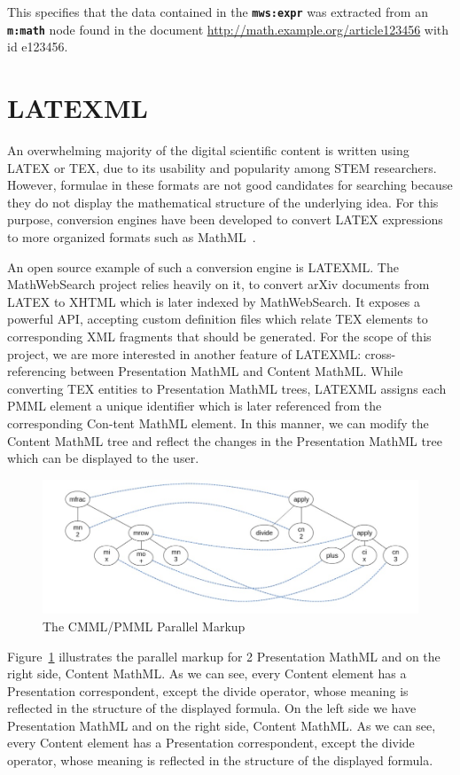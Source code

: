 \documentclass{deliverablereport}
\def\MWS{\textsf{MathWebSearch}\xspace}
\begin{document}
This specifies that the data contained in the \textbf{\texttt{mws:expr}} was extracted from an \textbf{\texttt{m:math}} node found in the document \url{http://math.example.org/article123456} with id e123456.

\section{LATEXML}\label{sec:ml}
An overwhelming majority of the digital scientific content is written using LATEX or TEX,
due to its usability and popularity among STEM researchers. However, formulae in these
formats are not good candidates for searching because they do not display the mathematical
structure of the underlying idea. For this purpose, conversion engines have been developed
to convert LATEX expressions to more organized formats such as MathML~\cite{Ham:bcs15}.

An open source example of such a conversion engine is LATEXML. The \MWS project
relies heavily on it, to convert arXiv documents from LATEX to XHTML which is later
indexed by \MWS. It exposes a powerful API, accepting custom definition files which relate
TEX elements to corresponding XML fragments that should be generated. For the scope of
this project, we are more interested in another feature of LATEXML: cross-referencing
between Presentation MathML and Content MathML. While converting TEX entities to
Presentation MathML trees, LATEXML assigns each PMML element a unique identifier which is
later referenced from the corresponding Con-tent MathML element. In this manner, we can
modify the Content MathML tree and reflect the changes in the Presentation MathML tree
which can be displayed to the user.
 

\begin{figure}[h]
\centering
 \includegraphics[scale=0.6]{figure2.jpg}
 \caption{The CMML/PMML Parallel Markup}
 \label{fig:markup}
\end{figure}

Figure~\ref{fig:markup} illustrates the parallel markup for 2 Presentation MathML and on the right side,
Content MathML. As we can see, every Content element has a Presentation correspondent,
except the divide operator, whose meaning is reflected in the structure of the displayed
formula. On the left side we have Presentation MathML and on the right side, Content
MathML. As we can see, every Content element has a Presentation correspondent, except the
divide operator, whose meaning is reflected in the structure of the displayed formula.
\end{document}
